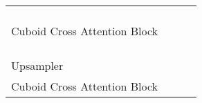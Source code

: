 \documentclass{article}
\begin{document}
\begin{table}[!tb]
\begin{center}
{\begin{tabular}{l|l|c|c}
    \multirow{12}{*}{Cuboid Cross Attention Block }&       &                  &              \\
                                                        &   &                       &              \\
                                                        &             &                       &              \\
                                                        &       &                       &              \\
                                                        &   &                       &              \\
                                                        &             &                       &              \\
                                                        &       &                       &              \\
                                                        &   &                       &              \\
                                                        &             &                       &              \\
                                                        &   &                  &              \\
                                                        &             &                       &              \\
                                                        &       &                       &              \\\hline
    \multirow{2}{*}{Upsampler}                          &   &  &      \\
                                                        &    &                       & \\\hline 
    \multirow{12}{*}{Cuboid Cross Attention Block }&       &                  &               \\
                                                        &   &                       &               \\
                                                        &             &                       &               \\
                                                        &       &                       &               \\
                                                        &   &                       &               \\

\end{tabular}}
\end{center}
\end{table}
\end{document}

